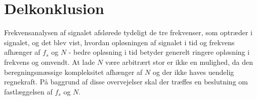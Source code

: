 \section{Delkonklusion}
Frekvensanalysen af signalet afslørede tydeligt de tre frekvenser, som optræder i signalet, og det blev vist, hvordan opløsningen af signalet i tid og frekvens afhænger af $f_s$ og $N$ - bedre opløsning i tid betyder generelt ringere opløsning i frekvens og omvendt. At lade $N$ være arbitrært stor er ikke en mulighed, da den beregningsmæssige kompleksitet afhænger af $N$ og der ikke haves uendelig regnekraft. På baggrund af disse overvejelser skal der træffes en beslutning om fastlæggelsen af $f_s$ og $N$.

















